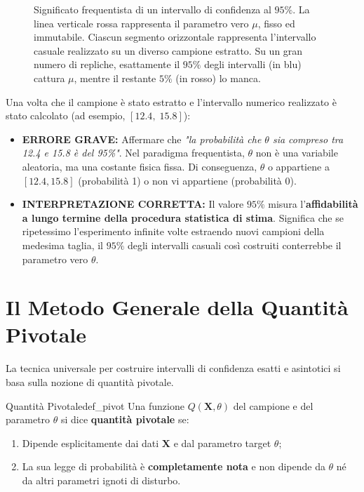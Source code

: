 \begin{figure}[htbp]
    \centering
    
    \caption{Significato frequentista di un intervallo di confidenza al $95\%$. La linea verticale rossa rappresenta il parametro vero $\mu$, fisso ed immutabile. Ciascun segmento orizzontale rappresenta l'intervallo casuale realizzato su un diverso campione estratto. Su un gran numero di repliche, esattamente il $95\%$ degli intervalli (in blu) cattura $\mu$, mentre il restante $5\%$ (in rosso) lo manca.}
    \label{fig:ic_ripetuti}
\end{figure}

\begin{esame}
Una volta che il campione è stato estratto e l'intervallo numerico realizzato è stato calcolato (ad esempio, $[12.4, \; 15.8]$):
\begin{itemize}
    \item \textbf{ERRORE GRAVE:} Affermare che \emph{"la probabilità che $\theta$ sia compreso tra 12.4 e 15.8 è del 95\%"}. Nel paradigma frequentista, $\theta$ non è una variabile aleatoria, ma una costante fisica fissa. Di conseguenza, $\theta$ o appartiene a $[12.4, 15.8]$ (probabilità 1) o non vi appartiene (probabilità 0).
    \item \textbf{INTERPRETAZIONE CORRETTA:} Il valore $95\%$ misura l'\textbf{affidabilità a lungo termine della procedura statistica di stima}. Significa che se ripetessimo l'esperimento infinite volte estraendo nuovi campioni della medesima taglia, il $95\%$ degli intervalli casuali così costruiti conterrebbe il parametro vero $\theta$.
\end{itemize}
\end{esame}

\section{Il Metodo Generale della Quantità Pivotale}
\label{sec:metodo_pivotale}

La tecnica universale per costruire intervalli di confidenza esatti e asintotici si basa sulla nozione di quantità pivotale.

\begin{definizione}{Quantità Pivotale}{def_pivot}
Una funzione $Q(\mathbf{X}, \theta)$ del campione e del parametro $\theta$ si dice \textbf{quantità pivotale} se:
\begin{enumerate}
    \item Dipende esplicitamente dai dati $\mathbf{X}$ e dal parametro target $\theta$;
    \item La sua legge di probabilità è \textbf{completamente nota} e non dipende da $\theta$ né da altri parametri ignoti di disturbo.
\end{enumerate}
\end{definizione}

